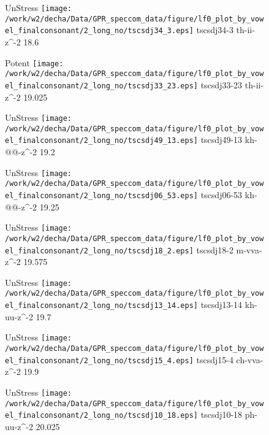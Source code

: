 \documentclass{article}
\begin{document}
\begin{figure}[t]
\begin{minipage}[b]{.24\textwidth}
UnStress
\centering
\texttt{[image: /work/w2/decha/Data/GPR\_speccom\_data/figure/lf0\_plot\_by\_vowel\_finalconsonant/2\_long\_no/tscsdj34\_3.eps]}
tscsdj34-3 th-ii-z\textasciicircum-2 18.6
\end{minipage}
\begin{minipage}[b]{.24\textwidth}
\colorbox{Apricot}{Potent}
\centering
\texttt{[image: /work/w2/decha/Data/GPR\_speccom\_data/figure/lf0\_plot\_by\_vowel\_finalconsonant/2\_long\_no/tscsdj33\_23.eps]}
tscsdj33-23 th-ii-z\textasciicircum-2 19.025
\end{minipage}
\begin{minipage}[b]{.24\textwidth}
UnStress
\centering
\texttt{[image: /work/w2/decha/Data/GPR\_speccom\_data/figure/lf0\_plot\_by\_vowel\_finalconsonant/2\_long\_no/tscsdj49\_13.eps]}
tscsdj49-13 kh-@@-z\textasciicircum-2 19.2
\end{minipage}
\begin{minipage}[b]{.24\textwidth}
UnStress
\centering
\texttt{[image: /work/w2/decha/Data/GPR\_speccom\_data/figure/lf0\_plot\_by\_vowel\_finalconsonant/2\_long\_no/tscsdj06\_53.eps]}
tscsdj06-53 kh-@@-z\textasciicircum-2 19.25
\end{minipage}
\end{figure}

\begin{figure}[t]
\begin{minipage}[b]{.24\textwidth}
UnStress
\centering
\texttt{[image: /work/w2/decha/Data/GPR\_speccom\_data/figure/lf0\_plot\_by\_vowel\_finalconsonant/2\_long\_no/tscsdj18\_2.eps]}
tscsdj18-2 m-vva-z\textasciicircum-2 19.575
\end{minipage}
\begin{minipage}[b]{.24\textwidth}
UnStress
\centering
\texttt{[image: /work/w2/decha/Data/GPR\_speccom\_data/figure/lf0\_plot\_by\_vowel\_finalconsonant/2\_long\_no/tscsdj13\_14.eps]}
tscsdj13-14 kh-uu-z\textasciicircum-2 19.7
\end{minipage}
\begin{minipage}[b]{.24\textwidth}
UnStress
\centering
\texttt{[image: /work/w2/decha/Data/GPR\_speccom\_data/figure/lf0\_plot\_by\_vowel\_finalconsonant/2\_long\_no/tscsdj15\_4.eps]}
tscsdj15-4 ch-vva-z\textasciicircum-2 19.9
\end{minipage}
\begin{minipage}[b]{.24\textwidth}
UnStress
\centering
\texttt{[image: /work/w2/decha/Data/GPR\_speccom\_data/figure/lf0\_plot\_by\_vowel\_finalconsonant/2\_long\_no/tscsdj10\_18.eps]}
tscsdj10-18 ph-uu-z\textasciicircum-2 20.025
\end{minipage}
\end{figure}
\end{document}
